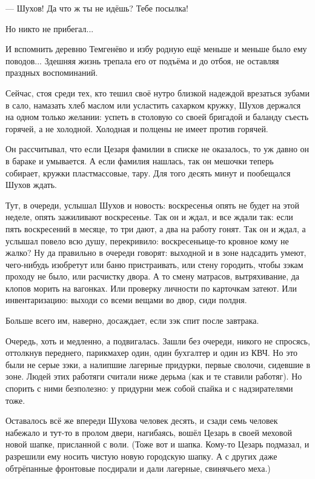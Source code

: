 --- Шухов! Да что ж ты не идёшь? Тебе посылка!

Но никто не прибегал...

И вспомнить деревню Темгенёво и избу родную ещё меньше и меньше было ему поводов... Здешняя
жизнь трепала его от подъёма и до отбоя, не оставляя праздных воспоминаний.

Сейчас, стоя среди тех, кто тешил своё нутро близкой надеждой врезаться зубами в сало,
намазать хлеб маслом или усластить сахарком кружку, Шухов держался на одном только желании:
успеть в столовую со своей бригадой и баланду съесть горячей, а не холодной. Холодная и
полцены не имеет против горячей.

Он рассчитывал, что если Цезаря фамилии в списке не оказалось, то уж давно он в бараке и
умывается. А если фамилия нашлась, так он мешочки теперь собирает, кружки пластмассовые,
тару. Для того десять минут и пообещался Шухов ждать.

Тут, в очереди, услышал Шухов и новость: воскресенья опять не будет на этой неделе, опять
зажиливают воскресенье. Так он и ждал, и все ждали так: если пять воскресений в месяце, то три
дают, а два на работу гонят. Так он и ждал, а услышал \dash повело всю душу, перекривило:
воскресеньице-то кровное кому не жалко? Ну да правильно в очереди говорят: выходной и в зоне
надсадить умеют, чего-нибудь изобретут \dash или баню пристраивать, или стену городить, чтобы
зэкам проходу не было, или расчистку двора. А то смену матрасов, вытряхивание, да клопов
морить на вагонках. Или проверку личности по карточкам затеют. Или инвентаризацию: выходи со
всеми вещами во двор, сиди полдня.

Больше всего им, наверно, досаждает, если зэк спит после завтрака.

Очередь, хоть и медленно, а подвигалась. Зашли без очереди, никого не спросясь, оттолкнув
переднего, \dash парикмахер один, один бухгалтер и один из КВЧ. Но это были не серые зэки, а
налипшие лагерные придурки, первые сволочи, сидевшие в зоне. Людей этих работяги считали
ниже дерьма (как и те ставили работяг). Но спорить с ними безполезно: у придурни меж собой
спайка и с надзирателями тоже.

Оставалось всё же впереди Шухова человек десять, и сзади семь человек набежало \dash и тут-то в
пролом двери, нагибаясь, вошёл Цезарь в своей меховой новой шапке, присланной с воли. (Тоже
вот и шапка. Кому-то Цезарь подмазал, и разрешили ему носить чистую новую городскую шапку. А с
других даже обтрёпанные фронтовые посдирали и дали лагерные, свинячьего меха.)

